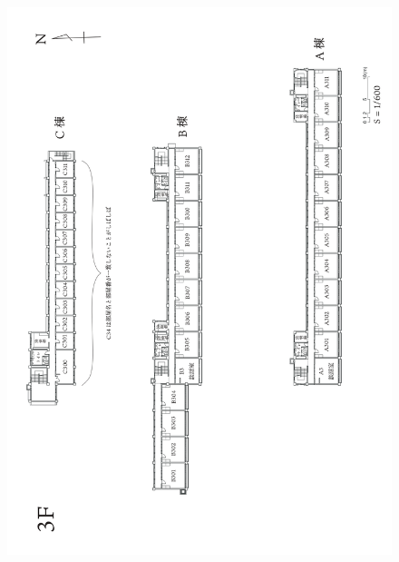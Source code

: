 \newpage
\begin{figure}[bh]
\centering
\includegraphics[]{gazo/熊野寮建物図面_ver.2_page-0004.jpg}
\end{figure}

